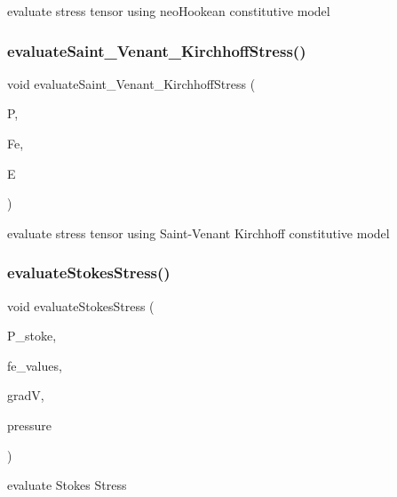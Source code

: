 evaluate stress tensor using neo\+Hookean constitutive model \mbox{\label{class_residual_a4215ec5a6eabd7573e0caeee6fd194ad}} 
\subsubsection{\texorpdfstring{evaluate\+Saint\+\_\+\+Venant\+\_\+\+Kirchhoff\+Stress()}{evaluateSaint\_Venant\_KirchhoffStress()}}
{\footnotesize\ttfamily void evaluate\+Saint\+\_\+\+Venant\+\_\+\+Kirchhoff\+Stress (\begin{DoxyParamCaption}\item[{dealii\+::\+Table$<$ 3, T $>$ \&}]{P,  }\item[{dealii\+::\+Table$<$ 3, T $>$ \&}]{Fe,  }\item[{dealii\+::\+Table$<$ 3, T $>$ \&}]{E }\end{DoxyParamCaption})}

evaluate stress tensor using Saint-\/\+Venant Kirchhoff constitutive model \mbox{\label{class_residual_a7e33928364e99df9a42db58752aca7f3}} 
\subsubsection{\texorpdfstring{evaluate\+Stokes\+Stress()}{evaluateStokesStress()}}
{\footnotesize\ttfamily void evaluate\+Stokes\+Stress (\begin{DoxyParamCaption}\item[{dealii\+::\+Table$<$ 3, T $>$}]{P\+\_\+stoke,  }\item[{const F\+E\+Values$<$ dim $>$ \&}]{fe\+\_\+values,  }\item[{Table$<$ 3, T $>$ \&}]{gradV,  }\item[{dealii\+::\+Table$<$ 1, T $>$ \&}]{pressure }\end{DoxyParamCaption})}

evaluate Stokes Stress \mbox{\label{class_residual_a4b181b84ebad5e2adb629b4a542dc9c6}} 
